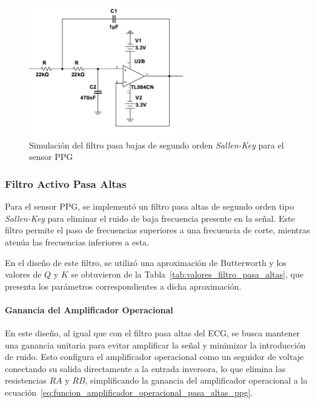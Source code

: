         \begin{figure}[H]
            \centering
            \includegraphics[width=0.6\textwidth]{img/Desarrollo/multisim_pasaBajos_ppg.png}
            \caption[Simulación del filtro pasa bajas de segundo orden \textit{Sallen-Key} para el sensor PPG.]{Simulación del filtro pasa bajas de segundo orden \textit{Sallen-Key} para el sensor PPG\footnotemark}
            \label{fig:Simulacion_Filtro_Pasa_Bajas_PPG}
        \end{figure}

        \subsubsection{Filtro Activo Pasa Altas}
        Para el sensor PPG, se implementó un filtro pasa altas de segundo orden tipo \textit{Sallen-Key} para eliminar el ruido de baja frecuencia presente en la señal. Este filtro permite el paso de frecuencias superiores a una frecuencia de corte, mientras atenúa las frecuencias inferiores a esta.

        En el diseño de este filtro, se utilizó una aproximación de Butterworth y los valores de $Q$ y $K$ se obtuvieron de la Tabla~\ref{tab:valores_filtro_pasa_altas}, que presenta los parámetros correspondientes a dicha aproximación.

        \paragraph{Ganancia del Amplificador Operacional}
        En este diseño, al igual que con el filtro pasa altas del ECG, se busca mantener una ganancia unitaria para evitar amplificar la señal y minimizar la introducción de ruido. Esto configura el amplificador operacional como un seguidor de voltaje conectando su salida directamente a la entrada inversora, lo que elimina las resistencias $RA$ y $RB$, simplificando la ganancia del amplificador operacional a la ecuación~\ref{eq:funcion_amplificador_operacional_pasa_altas_ppg}.

